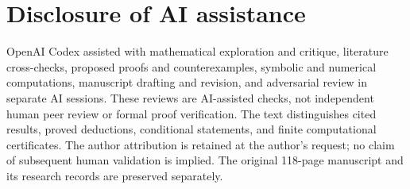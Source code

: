 \documentclass[10pt,a4paper,reqno]{amsart}
\numberwithin{equation}{section}
\theoremstyle{definition}\newtheorem{definition}[theorem]{Definition}
\theoremstyle{remark}\newtheorem{remark}[theorem]{Remark}
\begin{document}
\appendix











\section*{Disclosure of AI assistance}
OpenAI Codex assisted with mathematical exploration and critique,
literature cross-checks, proposed proofs and counterexamples,
symbolic and numerical computations, manuscript drafting and revision,
and adversarial review in separate AI sessions. These reviews are
AI-assisted checks, not independent human peer review or formal proof
verification. The text distinguishes cited results, proved deductions,
conditional statements, and finite computational certificates.
The author attribution is retained at the author's request; no claim
of subsequent human validation is implied. The original 118-page
manuscript and its research records are preserved separately.


\end{document}
